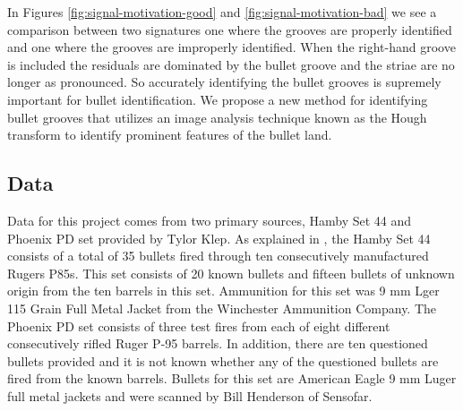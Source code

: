 \documentclass[12pt]{article}\usepackage[]{graphicx}\usepackage[]{color}
\theoremstyle{nonumberplain}
\begin{document}

In Figures \ref{fig:signal-motivation-good} and \ref{fig:signal-motivation-bad} we see a comparison between two signatures one where the grooves are properly identified and one where the grooves are improperly identified. When the right-hand groove is included the residuals are dominated by the bullet groove and the striae are no longer as pronounced. So accurately identifying the bullet grooves is supremely important for bullet identification. We propose a new method for identifying bullet grooves that utilizes an image analysis technique known as the Hough transform to identify prominent features of the bullet land. 


\subsection{Data}

Data for this project comes from two primary sources, Hamby Set 44 and Phoenix PD set provided by Tylor Klep.  As explained in \cite{Vanderplas2020}, the Hamby Set 44 consists of a total of 35 bullets fired through ten consecutively manufactured Rugers P85s. This set consists of 20 known bullets and fifteen bullets of unknown origin from the ten barrels in this set. Ammunition for this set was 9 mm Lger 115 Grain Full Metal Jacket from the Winchester Ammunition Company. The Phoenix PD set consists of three test fires from each of eight different consecutively rifled Ruger P-95 barrels. In addition, there are ten questioned bullets provided and it is not known whether any of the questioned bullets are fired from the known barrels. Bullets for this set are American Eagle 9 mm Luger full metal jackets and were scanned by Bill Henderson of Sensofar.
\end{document}
